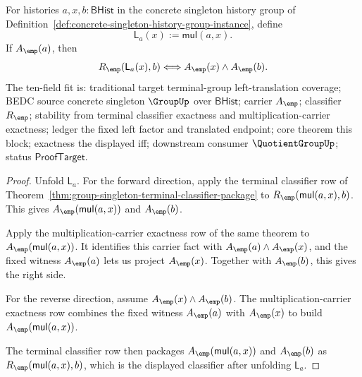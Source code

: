 \begin{theorem}
\label{thm:group-singleton-left-mul-classifier-coverage}
For histories $a,x,b:\mathsf{BHist}$ in the concrete singleton history group of
Definition~\ref{def:concrete-singleton-history-group-instance}, define
$$
\mathsf{L}_a(x):=\mathsf{mul}(a,x).
$$
If $A_{\emp}(a)$, then
$$
R_{\emp}(\mathsf{L}_a(x),b)
\Longleftrightarrow A_{\emp}(x)\land A_{\emp}(b).
$$
The ten-field fit is: traditional target terminal-group left-translation
coverage; BEDC source concrete singleton $\GroupUp$ over $\mathsf{BHist}$;
carrier $A_{\emp}$; classifier $R_{\emp}$; stability from terminal classifier
exactness and multiplication-carrier exactness; ledger the fixed left factor
and translated endpoint; core theorem this block; exactness the displayed iff;
downstream consumer $\QuotientGroupUp$; status $\mathsf{ProofTarget}$.
\end{theorem}
\begin{proof}
Unfold $\mathsf{L}_a$. For the forward direction, apply the terminal
classifier row of Theorem~\ref{thm:group-singleton-terminal-classifier-package}
to $R_{\emp}(\mathsf{mul}(a,x),b)$. This gives
$A_{\emp}(\mathsf{mul}(a,x))$ and $A_{\emp}(b)$.

Apply the multiplication-carrier exactness row of the same theorem to
$A_{\emp}(\mathsf{mul}(a,x))$. It identifies this carrier fact with
$A_{\emp}(a)\land A_{\emp}(x)$, and the fixed witness $A_{\emp}(a)$ lets us
project $A_{\emp}(x)$. Together with $A_{\emp}(b)$, this gives the right side.

For the reverse direction, assume $A_{\emp}(x)\land A_{\emp}(b)$.
The multiplication-carrier exactness row combines the fixed witness
$A_{\emp}(a)$ with $A_{\emp}(x)$ to build
$A_{\emp}(\mathsf{mul}(a,x))$.

The terminal classifier row then packages
$A_{\emp}(\mathsf{mul}(a,x))$ and $A_{\emp}(b)$ as
$R_{\emp}(\mathsf{mul}(a,x),b)$, which is the displayed classifier after
unfolding $\mathsf{L}_a$.
\end{proof}

